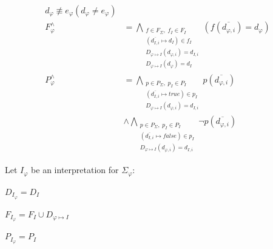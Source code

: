 \documentclass{easychair}
\newenvironment{packed_itemize}{
\vspace*{-0.2em}
\begin{itemize}
\setlength{\partopsep}{0pt}
\setlength{\itemsep}{1pt}
\setlength{\parskip}{0pt}
\setlength{\parsep}{0pt}
}{\end{itemize}}
\newcommand{\true}{{\mathit{true}}}
\newcommand{\false}{{\mathit{false}}}
\begin{document}
\begin{packed_itemize}
\begin{equation*}
\begin{split}
{{                                           d_{\varphi} \not\equiv e_{\varphi}}} \left(d_{\varphi} \neq e_{\varphi} \right) \\
F^\wedge_{\varphi} &= \bigwedge_{\substack{f \in F_\Sigma,\;f_I \in F_I \\
                                           (\overline{d_{I,i}} \mapsto d_I) \in f_I \\
                                           D_{\varphi \mapsto I}(d_{\varphi,i}) = d_{I,i} \\
                                           D_{\varphi \mapsto I}(d_{\varphi}) = d_I}} 
                                 ( f(\overline{d_{\varphi,i}}) = d_{\varphi} ) \\
P^\wedge_{\varphi} &= \bigwedge_{\substack{p \in P_\Sigma,\;p_I \in P_I \\
                                           (\overline{d_{I,i}} \mapsto \true) \in p_I \\
                                           D_{\varphi \mapsto I}(d_{\varphi,i}) = d_{I,i}}}
                                 p(\overline{d_{\varphi,i}}) \\
              &\wedge \bigwedge_{\substack{p \in P_\Sigma,\;p_I \in P_I \\
                                           (\overline{d_{I,i}} \mapsto \false) \in p_I \\
                                           D_{\varphi \mapsto I}(d_{\varphi,i}) = d_{I,i}}}
                                 \neg p(\overline{d_{\varphi,i}})
\end{split}
\end{equation*}
\end{packed_itemize}

\noindent
Let $I_{\varphi}$ be an interpretation for $\Sigma_{\varphi}$:
\begin{packed_itemize}
\item $D_{I_{\varphi}} = D_I$
\item $F_{I_{\varphi}} = F_I \cup D_{\varphi \mapsto I}$
\item $P_{I_{\varphi}} = P_I$
\end{packed_itemize}
\end{document}
